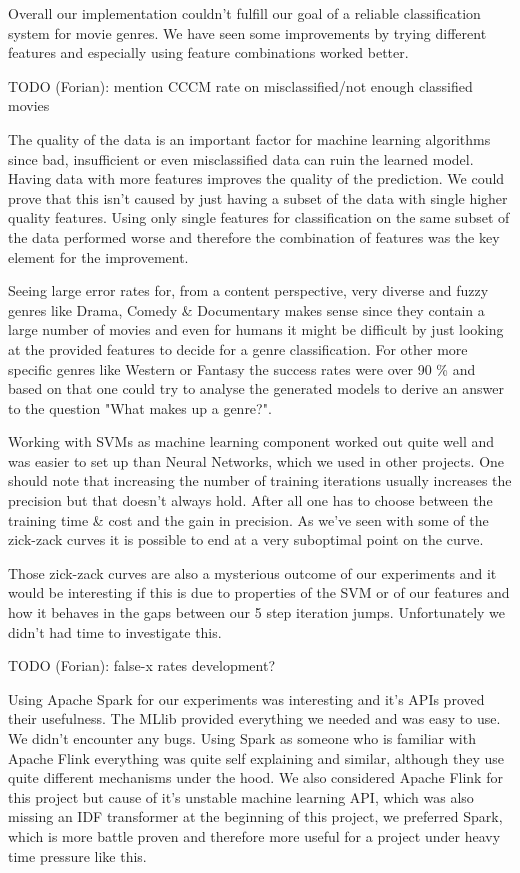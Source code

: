 \documentclass{vldb}
\begin{document}
\par Overall our implementation couldn't fulfill our goal of a reliable classification system for movie genres. We have seen some improvements by trying different features and especially using feature combinations worked better.
\par TODO (Forian): mention CCCM rate on misclassified/not enough classified movies
\par The quality of the data is an important factor for machine learning algorithms since bad, insufficient or even misclassified data can ruin the learned model. Having data with more features improves the quality of the prediction. We could prove that this isn't caused by just having a subset of the data with single higher quality features. Using only single features for classification on the same subset of the data performed worse and therefore the combination of features was the key element for the improvement.
\par Seeing large error rates for, from a content perspective, very diverse and fuzzy genres like Drama, Comedy \& Documentary makes sense since they contain a large number of movies and even for humans it might be difficult by just looking at the provided features to decide for a genre classification. For other more specific genres like Western or Fantasy the success rates were over 90 \% and based on that one could try to analyse the generated models to derive an answer to the question "What makes up a genre?".
\par Working with SVMs as machine learning component worked out quite well and was easier to set up than Neural Networks, which we used in other projects. One should note that increasing the number of training iterations usually increases the precision but that doesn't always hold. After all one has to choose between the training time \& cost and the gain in precision. As we've seen with some of the zick-zack curves it is possible to end at a very suboptimal point on the curve.
\par Those zick-zack curves are also a mysterious outcome of our experiments and it would be interesting if this is due to properties of the SVM or of our features and how it behaves in the gaps between our 5 step iteration jumps. Unfortunately we didn't had time to investigate this.
\par TODO (Forian): false-x rates development?
\par Using Apache Spark for our experiments was interesting and it's APIs proved their usefulness. The MLlib provided everything we needed and was easy to use. We didn't encounter any bugs. Using Spark as someone who is familiar with Apache Flink\cite{flink} everything was quite self explaining and similar, although they use quite different mechanisms under the hood. We also considered Apache Flink for this project but cause of it's unstable machine learning API, which was also missing an IDF transformer at the beginning of this project, we preferred Spark, which is more battle proven and therefore more useful for a project under heavy time pressure like this.
\end{document}
